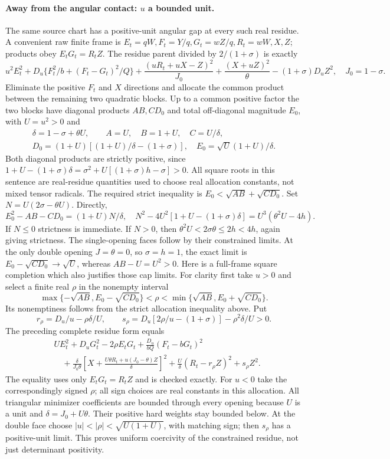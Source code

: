 \paragraph{Away from the angular contact: $u$ a bounded unit.}
The same source chart has a positive-unit angular gap at every such real
residue. A convenient raw finite frame is
$E_t=qW,F_t=Y/q,G_t=wZ/q,R_t=wW,X,Z$; products obey $E_tG_t=R_tZ$.
The residue parent divided by $2/(1+\sigma)$ is exactly
\[
u^2E_t^2+D_u\{F_t^2/b+(F_t-G_t)^2/Q\}
 +\frac{(uR_t+uX-Z)^2}{J_0}
 +\frac{(X+uZ)^2}{\theta}-(1+\sigma)D_uZ^2,
\quad J_0=1-\sigma.
\]
Eliminate the positive $F_t$ and $X$ directions and allocate
the common product between the remaining two quadratic blocks. Up to a
common positive factor the two blocks have diagonal products $AB,CD_0$
and total off-diagonal magnitude $E_0$, with $U=u^2>0$ and
\[
\begin{gathered}
\delta=1-\sigma+\theta U,\qquad
A=U,\quad B=1+U,\quad C=U/\delta,\\
D_0=(1+U)[(1+U)/\delta-(1+\sigma)],\quad
E_0=\sqrt U(1+U)/\delta.
\end{gathered}
\]
Both diagonal products are strictly positive, since
$1+U-(1+\sigma)\delta=\sigma^2+U[(1+\sigma)h-\sigma]>0$.
All square roots in this sentence are real-residue quantities used to
choose real allocation constants, not mixed tensor radicals.
The required strict inequality is $E_0<\sqrt{AB}+\sqrt{CD_0}$.
Set $N=U(2\sigma-\theta U)$. Directly,
\[
E_0^2-AB-CD_0=(1+U)N/\delta,\quad
N^2-4U^2[1+U-(1+\sigma)\delta]
 =U^3(\theta^2U-4h).
\]
If $N\leq0$ strictness is immediate. If $N>0$, then
$\theta^2U<2\sigma\theta\leq2h<4h$, again giving strictness.
The single-opening faces follow by their constrained limits. At the only
double opening $J=\theta=0$, so $\sigma=h=1$, the exact limit is
$E_0-\sqrt{CD_0}\longrightarrow\sqrt U$, whereas $AB-U=U^2>0$.
Here is a full-frame square completion which also justifies those cap
limits. For clarity first take $u>0$ and select a finite real
$\rho$ in the nonempty interval
\[
\max\{-\sqrt{AB},E_0-\sqrt{CD_0}\}<\rho
 <\min\{\sqrt{AB},E_0+\sqrt{CD_0}\}.
\]
Its nonemptiness follows from the strict allocation inequality above.
Put
\[
r_\rho=D_u/u-\rho\delta/U,\qquad
s_\rho=D_u[2\rho/u-(1+\sigma)]-\rho^2\delta/U>0.
\]
The preceding complete residue form equals
\begin{align*}
&UE_t^2+D_uG_t^2-2\rho E_tG_t
 +\frac{D_u}{bQ}(F_t-bG_t)^2\\
&\quad+\frac{\delta}{J_0\theta}
 \left[X+\frac{U\theta R_t+u(J_0-\theta)Z}{\delta}\right]^2
 +\frac U\delta(R_t-r_\rho Z)^2+s_\rho Z^2.
\end{align*}
The equality uses only $E_tG_t=R_tZ$ and is checked exactly.
For $u<0$ take the correspondingly signed $\rho$; all sign choices are
real constants in this allocation. All triangular minimizer coefficients
are bounded through every opening because $U$ is a unit and
$\delta=J_0+U\theta$. Their positive hard weights stay bounded below.
At the double face choose $|u|<|\rho|<\sqrt{U(1+U)}$, with matching
sign; then $s_\rho$ has a positive-unit limit. This proves uniform
coercivity of the constrained residue, not just determinant positivity.

